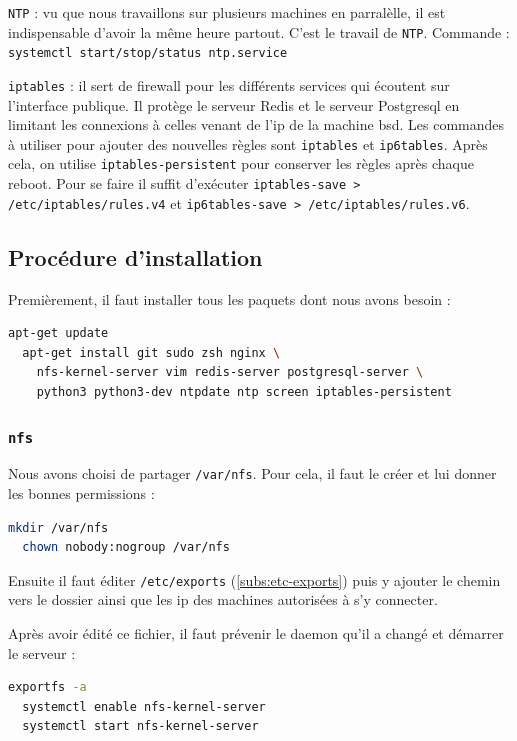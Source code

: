 \documentclass[10pt,a4paper]{article}
\begin{document}
\texttt{NTP} : vu que nous travaillons sur plusieurs machines en parralèlle, il est indispensable d'avoir la même heure partout.
C'est le travail de \texttt{NTP}.
Commande : \texttt{systemctl start/stop/status ntp.service}

\texttt{iptables} : il sert de firewall pour les différents services qui écoutent sur l'interface publique.
Il protège le serveur Redis et le serveur Postgresql en limitant les connexions à celles venant de l'ip de la machine bsd.
Les commandes à utiliser pour ajouter des nouvelles règles sont \texttt{iptables} et \texttt{ip6tables}.
Après cela, on utilise \texttt{iptables-persistent} pour conserver les règles après chaque reboot. Pour se faire il suffit d'exécuter \texttt{iptables-save > /etc/iptables/rules.v4} et \texttt{ip6tables-save > /etc/iptables/rules.v6}.


\subsection{Procédure d'installation}

Premièrement, il faut installer tous les paquets dont nous avons besoin :
\begin{lstlisting}[language=bash]
  apt-get update
  apt-get install git sudo zsh nginx \
    nfs-kernel-server vim redis-server postgresql-server \
    python3 python3-dev ntpdate ntp screen iptables-persistent
\end{lstlisting}

\subsubsection{\texttt{nfs}}

Nous avons choisi de partager \texttt{/var/nfs}. Pour cela, il faut le créer et lui donner les bonnes permissions :

\begin{lstlisting}[language=bash]
  mkdir /var/nfs
  chown nobody:nogroup /var/nfs
\end{lstlisting}

Ensuite il faut éditer \texttt{/etc/exports} (\ref{subs:etc-exports}) puis y ajouter le chemin vers
le dossier ainsi que les ip des machines autorisées à s'y connecter.

Après avoir édité ce fichier, il faut prévenir le daemon qu'il a changé et démarrer le serveur :
\begin{lstlisting}[language=bash]
  exportfs -a
  systemctl enable nfs-kernel-server
  systemctl start nfs-kernel-server
\end{lstlisting}
\end{document}
